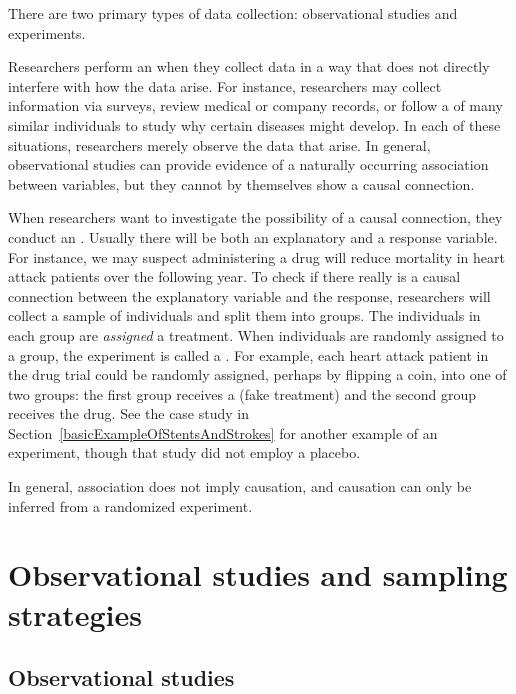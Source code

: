 There are two primary types of data collection: observational studies and experiments.

Researchers perform an  when they collect data in a way that does not directly interfere with how the data arise. For instance, researchers may collect information via surveys, review medical or company records, or follow a  of many similar individuals to study why certain diseases might develop. In each of these situations, researchers merely observe the data that arise. In general, observational studies can provide evidence of a naturally occurring association between variables, but they cannot by themselves show a causal connection.

When researchers want to investigate the possibility of a causal connection, they conduct an . Usually there will be both an explanatory and a response variable. For instance, we may suspect administering a drug will reduce mortality in heart attack patients over the following year. To check if there really is a causal connection between the explanatory variable and the response, researchers will collect a sample of individuals and split them into groups. The individuals in each group are \emph{assigned} a treatment. When individuals are randomly assigned to a group, the experiment is called a . For example, each heart attack patient in the drug trial could be randomly assigned,  perhaps by flipping a coin, into one of two groups: the first group receives a  (fake treatment) and the second group receives the drug. See the case study in Section~\ref{basicExampleOfStentsAndStrokes} for another example of an experiment, though that study did not employ a placebo.

\begin{tipBox}{
In general, association does not imply causation, and causation can only be inferred from a randomized experiment.}
\end{tipBox}


\section[Observational studies and sampling strategies]{Observational studies and sampling strategies }

\subsection{Observational studies}

